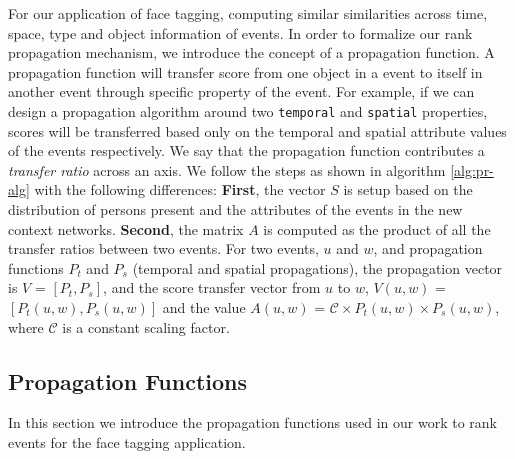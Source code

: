 For our application of face tagging, computing similar similarities across time, space, type and object information of events. In order to formalize our rank propagation mechanism, we introduce the concept of a propagation function. A propagation function will transfer score from one object in a event to itself in another event through specific property of the event. For example, if we can design a propagation algorithm around two \texttt{temporal} and \texttt{spatial} properties, scores will be transferred based only on the temporal and spatial attribute values of the events respectively. We say that the propagation function contributes a \textit{transfer ratio} across an axis. We follow the steps as shown in algorithm \ref{alg:pr-alg} with the following differences: \textbf{First}, the vector $S$ is setup based on the distribution of persons present and the attributes of the events in the new context networks. \textbf{Second}, the matrix $A$ is computed as the product of all the transfer ratios between two events. For two events, $u$ and $w$, and propagation functions $P_t$ and $P_s$ (temporal and spatial propagations), the propagation vector is $V$ = $[P_t, P_s]$, and the score transfer vector from $u$ to $w$, $V(u, w)$ = $[P_t(u, w), P_s(u, w)]$ and the value $A(u, w)$ = $\mathcal{C} \times P_t(u, w) \times P_s(u, w)$, where $\mathcal C$ is a constant scaling factor.

\subsection{Propagation Functions}

In this section we introduce the propagation functions used in our work to rank events for the face tagging application.

